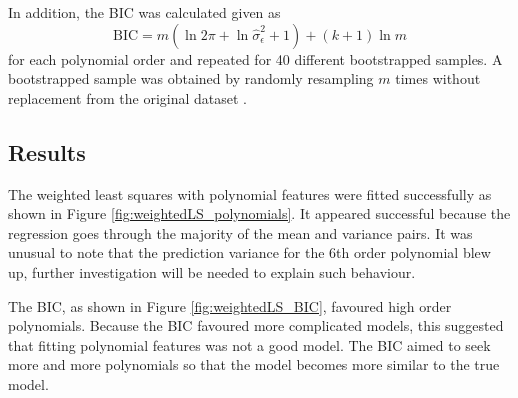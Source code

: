 \documentclass[12pt]{report}
\begin{document}
In addition, the BIC \cite[p.~233]{friedman2009elements} was calculated given as
\begin{equation}
\text{BIC} = m\left(\ln2\pi+\ln\widehat{\sigma}_\epsilon^2+1\right)+(k+1)\ln{m}
\end{equation}
for each polynomial order and repeated for 40 different bootstrapped samples. A bootstrapped sample was obtained by randomly resampling $m$ times without replacement from the original dataset \cite{efron1992bootstrap}. 

\subsection{Results}
The weighted least squares with polynomial features were fitted successfully as shown in Figure \ref{fig:weightedLS_polynomials}. It appeared successful because the regression goes through the majority of the mean and variance pairs. It was unusual to note that the prediction variance for the 6th order polynomial blew up, further investigation will be needed to explain such behaviour.

The BIC, as shown in Figure \ref{fig:weightedLS_BIC}, favoured high order polynomials. Because the BIC favoured more complicated models, this suggested that fitting polynomial features was not a good model. The BIC aimed to seek more and more polynomials so that the model becomes more similar to the true model. 
\end{document}
